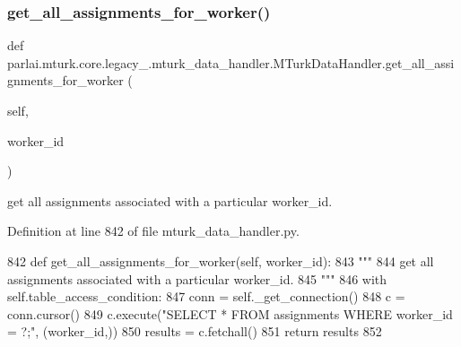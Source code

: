 \subsubsection{\texorpdfstring{get\+\_\+all\+\_\+assignments\+\_\+for\+\_\+worker()}{get\_all\_assignments\_for\_worker()}}
{\footnotesize\ttfamily def parlai.\+mturk.\+core.\+legacy\+\_.\+mturk\+\_\+data\+\_\+handler.\+M\+Turk\+Data\+Handler.\+get\+\_\+all\+\_\+assignments\+\_\+for\+\_\+worker (\begin{DoxyParamCaption}\item[{}]{self,  }\item[{}]{worker\+\_\+id }\end{DoxyParamCaption})}

\begin{DoxyVerb}get all assignments associated with a particular worker_id.
\end{DoxyVerb}
 

Definition at line 842 of file mturk\+\_\+data\+\_\+handler.\+py.


\begin{DoxyCode}
842     \textcolor{keyword}{def }get\_all\_assignments\_for\_worker(self, worker\_id):
843         \textcolor{stringliteral}{"""}
844 \textcolor{stringliteral}{        get all assignments associated with a particular worker\_id.}
845 \textcolor{stringliteral}{        """}
846         with self.table\_access\_condition:
847             conn = self.\_get\_connection()
848             c = conn.cursor()
849             c.execute(\textcolor{stringliteral}{"SELECT * FROM assignments WHERE worker\_id = ?;"}, (worker\_id,))
850             results = c.fetchall()
851             \textcolor{keywordflow}{return} results
852 
\end{DoxyCode}
\mbox{\label{classparlai_1_1mturk_1_1core_1_1legacy__2018_1_1mturk__data__handler_1_1MTurkDataHandler_ac4805766f3155d1768d3aff70aaf404c}} 
